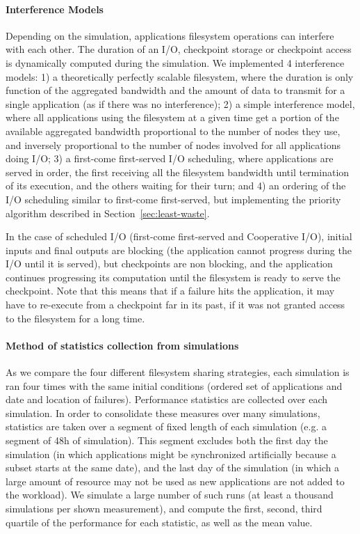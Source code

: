 \paragraph*{Interference Models}
Depending on the simulation, applications filesystem operations can
interfere with each other. The duration of an I/O, checkpoint storage
or checkpoint access is dynamically computed during the simulation. We
implemented 4 interference models: 1) a theoretically perfectly scalable
filesystem, where the duration is only function of the aggregated
bandwidth and the amount of data to transmit for a single application
(as if there was no interference); 2) a simple interference model,
where all applications using the filesystem at a given time get a
portion of the available aggregated bandwidth proportional to the
number of nodes they use, and inversely proportional to the number of
nodes involved for all applications doing I/O; 3) a first-come
first-served I/O scheduling, where applications are served in order,
the first receiving all the filesystem bandwidth until termination of
its execution, and the others waiting for their turn; and 4) an
ordering of the I/O scheduling similar to first-come first-served, but
implementing the priority algorithm \leastwaste described in
Section~\ref{sec:least-waste}.

In the case of scheduled I/O (first-come first-served and Cooperative
I/O), initial inputs and final outputs are blocking (the application
cannot progress during the I/O until it is served), but checkpoints
are non blocking, and the application continues progressing its
computation until the filesystem is ready to serve the
checkpoint. Note that this means that if a failure hits the
application, it may have to re-execute from a checkpoint far in its
past, if it was not granted access to the filesystem for a long time.

\paragraph*{Method of statistics collection from simulations}
As we compare the four different filesystem sharing strategies, each
simulation is ran four times with the same initial conditions (ordered
set of applications and date and location of failures). Performance
statistics are collected over each simulation. In order to consolidate
these measures over many simulations, statistics are taken over a
segment of fixed length of each simulation (e.g. a segment of 48h of
simulation). This segment excludes both the first day the simulation
(in which applications might be synchronized artificially because a
subset starts at the same date), and the last day of the simulation
(in which a large amount of resource may not be used as new
applications are not added to the workload). We simulate a large
number of such runs (at least a thousand simulations per shown
measurement), and compute the first, second, third quartile of the
performance for each statistic, as well as the mean value.
